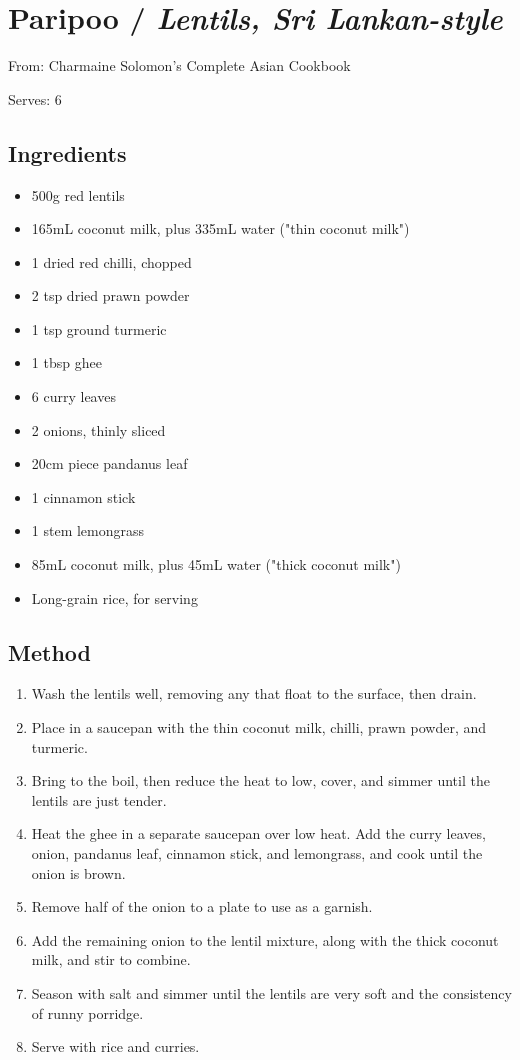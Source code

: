 \clearpage
\section{Paripoo / \emph{Lentils, Sri Lankan-style}}


From: Charmaine Solomon's Complete Asian Cookbook

Serves: 6

\subsection{Ingredients}

\begin{itemize}
	\item 500g red lentils
	\item 165mL coconut milk, plus 335mL water ("thin coconut milk")
	\item 1 dried red chilli, chopped
	\item 2 tsp dried prawn powder
	\item 1 tsp ground turmeric
	\item 1 tbsp ghee
	\item 6 curry leaves
	\item 2 onions, thinly sliced
	\item 20cm piece pandanus leaf
	\item 1 cinnamon stick
	\item 1 stem lemongrass
	\item 85mL coconut milk, plus 45mL water ("thick coconut milk")
	\item Long-grain rice, for serving
\end{itemize}

\subsection{Method}

\begin{enumerate}
    \item Wash the lentils well, removing any that float to the surface, then drain. 
    \item Place in a saucepan with the thin coconut milk, chilli, prawn powder, and turmeric.
    \item Bring to the boil, then reduce the heat to low, cover, and simmer until the lentils are just tender. 
    \item Heat the ghee in a separate saucepan over low heat. Add the curry leaves, onion, pandanus leaf, cinnamon stick, and lemongrass, and cook until the onion is brown.
    \item Remove half of the onion to a plate to use as a garnish.
    \item Add the remaining onion to the lentil mixture, along with the thick coconut milk, and stir to combine.
    \item Season with salt and simmer until the lentils are very soft and the consistency of runny porridge.
    \item Serve with rice and curries.
\end{enumerate}
